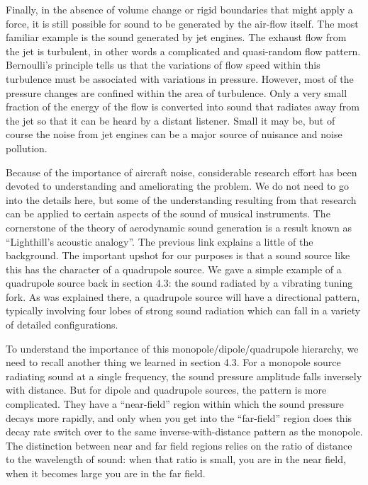   Finally, in the absence of volume change or rigid boundaries that might apply 
  a force, it is still possible for sound to be generated by the air-flow 
  itself. The most familiar example is the sound generated by jet engines. The 
  exhaust flow from the jet is turbulent, in other words a complicated and 
  quasi-random flow pattern. Bernoulli’s principle tells us that the variations 
  of flow speed within this turbulence must be associated with variations in 
  pressure. However, most of the pressure changes are confined within the area 
  of turbulence. Only a very small fraction of the energy of the flow is 
  converted into sound that radiates away from the jet so that it can be heard 
  by a distant listener. Small it may be, but of course the noise from jet 
  engines can be a major source of nuisance and noise pollution. 

  Because of the importance of aircraft noise, considerable research effort has 
  been devoted to understanding and ameliorating the problem. We do not need to 
  go into the details here, but some of the understanding resulting from that 
  research can be applied to certain aspects of the sound of musical 
  instruments. The cornerstone of the theory of aerodynamic sound generation is 
  a result known as “Lighthill’s acoustic analogy”. The previous link explains 
  a little of the background. The important upshot for our purposes is that a 
  sound source like this has the character of a quadrupole source. We gave a 
  simple example of a quadrupole source back in section 4.3: the sound radiated 
  by a vibrating tuning fork. As was explained there, a quadrupole source will 
  have a directional pattern, typically involving four lobes of strong sound 
  radiation which can fall in a variety of detailed configurations. 

  To understand the importance of this monopole/dipole/quadrupole hierarchy, we 
  need to recall another thing we learned in section 4.3. For a monopole source 
  radiating sound at a single frequency, the sound pressure amplitude falls 
  inversely with distance. But for dipole and quadrupole sources, the pattern 
  is more complicated. They have a “near-field” region within which the sound 
  pressure decays more rapidly, and only when you get into the “far-field” 
  region does this decay rate switch over to the same inverse-with-distance 
  pattern as the monopole. The distinction between near and far field regions 
  relies on the ratio of distance to the wavelength of sound: when that ratio 
  is small, you are in the near field, when it becomes large you are in the far 
  field. 

